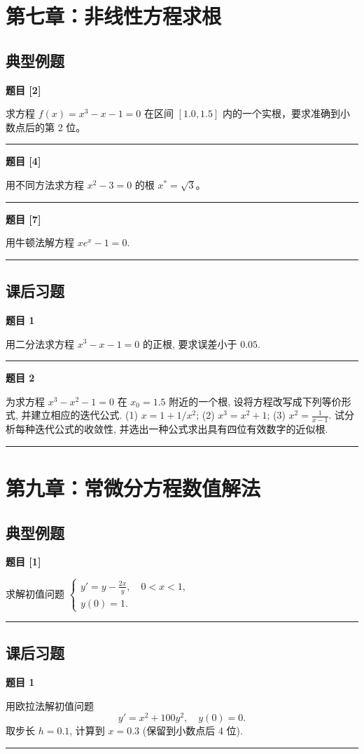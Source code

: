 \documentclass[a4paper,12pt]{ctexart}
\newcommand{\problem}[1]{
    \par\noindent\textbf{题目 #1} \quad
}
\newcommand{\workspace}[1][5cm]{
    \par
    \vspace{#1}
    \noindent\rule{\textwidth}{0.1pt} %
    \vspace{0.5em}
    \par
}
\begin{document}
\newpage

\section{第七章：非线性方程求根}

\subsection*{典型例题}

\problem{[2]}
求方程 $f(x) = x^3 - x - 1 = 0$ 在区间 $[1.0, 1.5]$ 内的一个实根，要求准确到小数点后的第 2 位。
\workspace[8cm]

\problem{[4]}
用不同方法求方程 $x^2 - 3 = 0$ 的根 $x^* = \sqrt{3}$。
\workspace[6cm]

\problem{[7]}
用牛顿法解方程 $xe^x - 1 = 0$.
\workspace[6cm]

\subsection*{课后习题}

\problem{1}
用二分法求方程 $x^3 - x - 1 = 0$ 的正根, 要求误差小于 $0.05$.
\workspace[8cm]

\problem{2}
为求方程 $x^3 - x^2 - 1 = 0$ 在 $x_0 = 1.5$ 附近的一个根, 设将方程改写成下列等价形式, 并建立相应的迭代公式.
(1) $x = 1 + 1/x^2$; \quad
(2) $x^3 = x^2 + 1$; \quad
(3) $x^2 = \frac{1}{x-1}$.
试分析每种迭代公式的收敛性, 并选出一种公式求出具有四位有效数字的近似根.
\workspace[10cm]

\newpage

\section{第九章：常微分方程数值解法}

\subsection*{典型例题}

\problem{[1]}
求解初值问题 $\begin{cases} y' = y - \frac{2x}{y}, \quad 0 < x < 1, \\ y(0) = 1. \end{cases}$
\workspace[8cm]

\subsection*{课后习题}

\problem{1}
用欧拉法解初值问题
\[
y' = x^2 + 100y^2, \quad y(0) = 0.
\]
取步长 $h=0.1$, 计算到 $x=0.3$ (保留到小数点后 4 位).
\workspace[8cm]
\end{document}
